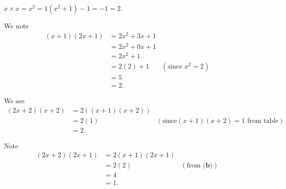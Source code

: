 \begin{questions}
    \item \begin{partquestions}{\alph*}
        \item $x \times x = x^2 = 1(x^2+1) - 1 = -1 = 2$.

        \item We note
        \begin{align*}
            (x+1)(2x+1) &= 2x^2 + 3x + 1\\
            &= 2x^2 + 0x + 1\\
            &= 2x^2 + 1\\
            &= 2(2) + 1 & (\text{since } x^2 = 2)\\
            &= 5\\
            &= 2.
        \end{align*}

        \item We see
        \begin{align*}
            (2x+2)(x+2) &= 2\left((x+1)(x+2)\right)\\
            &= 2(1) & (\text{since} (x+1)(x+2) = 1 \text{ from table})\\
            &= 2.
        \end{align*}

        \item Note
        \begin{align*}
            (2x+2)(2x+1) &= 2(x+1)(2x+1)\\
            &= 2(2) & (\text{from }\textbf{(b)})\\
            &= 4\\
            &= 1.
        \end{align*}
    \end{partquestions}
\end{questions}

